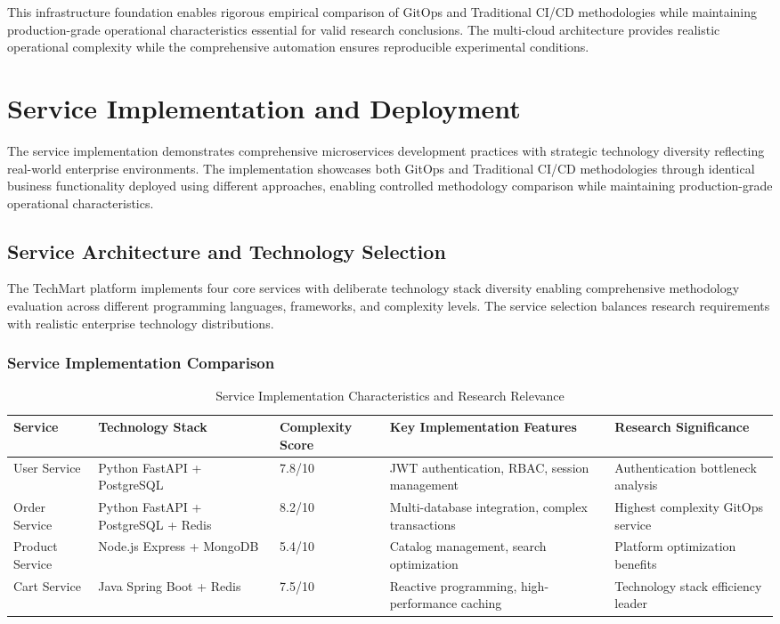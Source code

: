 This infrastructure foundation enables rigorous empirical comparison of GitOps and Traditional CI/CD methodologies while maintaining production-grade operational characteristics essential for valid research conclusions. The multi-cloud architecture provides realistic operational complexity while the comprehensive automation ensures reproducible experimental conditions.

\section{Service Implementation and Deployment}

The service implementation demonstrates comprehensive microservices development practices with strategic technology diversity reflecting real-world enterprise environments. The implementation showcases both GitOps and Traditional CI/CD methodologies through identical business functionality deployed using different approaches, enabling controlled methodology comparison while maintaining production-grade operational characteristics.

\subsection{Service Architecture and Technology Selection}

The TechMart platform implements four core services with deliberate technology stack diversity enabling comprehensive methodology evaluation across different programming languages, frameworks, and complexity levels. The service selection balances research requirements with realistic enterprise technology distributions.

\subsubsection{Service Implementation Comparison}

\begin{table}[H]
\centering
\caption{Service Implementation Characteristics and Research Relevance}
\label{tab:service-implementation-comparison}
\begin{tabular}{|p{2.5cm}|p{3cm}|p{2cm}|p{3cm}|p{3.5cm}|}
\hline
\textbf{Service} & \textbf{Technology Stack} & \textbf{Complexity Score} & \textbf{Key Implementation Features} & \textbf{Research Significance} \\
\hline
User Service & Python FastAPI + PostgreSQL & 7.8/10 & JWT authentication, RBAC, session management & Authentication bottleneck analysis \\
\hline
Order Service & Python FastAPI + PostgreSQL + Redis & 8.2/10 & Multi-database integration, complex transactions & Highest complexity GitOps service \\
\hline
Product Service & Node.js Express + MongoDB & 5.4/10 & Catalog management, search optimization & Platform optimization benefits \\
\hline
Cart Service & Java Spring Boot + Redis & 7.5/10 & Reactive programming, high-performance caching & Technology stack efficiency leader \\
\hline
\end{tabular}
\end{table}


